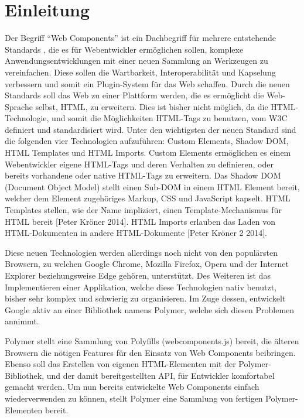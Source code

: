 \chapter{Einleitung}\label{einleitung}

Der Begriff ``Web Components'' ist ein Dachbegriff für mehrere
entstehende Standards \cite{WebComponentsC24:online}, die es für
Webentwickler ermöglichen sollen, komplexe Anwendungsentwicklungen mit
einer neuen Sammlung an Werkzeugen zu vereinfachen. Diese sollen die
Wartbarkeit, Interoperabilität und Kapselung verbessern und somit ein
Plugin-System für das Web schaffen. Durch die neuen Standards soll das
Web zu einer Plattform werden, die es ermöglicht die Web-Sprache selbst,
\ac{HTML}, zu erweitern. Dies ist bisher nicht möglich, da die
HTML-Technologie, und somit die Möglichkeiten HTML-Tags zu benutzen, vom
\ac{W3C} definiert und standardisiert wird. Unter den wichtigsten der
neuen Standard sind die folgenden vier Technologien aufzuführen: Custom
Elements, Shadow DOM, HTML Templates und HTML Imports. Custom Elements
ermöglichen es einem Webentwickler eigene HTML-Tags und deren Verhalten
zu definieren, oder bereits vorhandene oder native HTML-Tags zu
erweitern. Das Shadow DOM (Document Object Model) stellt einen Sub-DOM
in einem HTML Element bereit, welcher dem Element zugehöriges Markup,
CSS und JavaScript kapselt. HTML Templates stellen, wie der Name
impliziert, einen Template-Mechanismus für HTML bereit {[}Peter Kröner
2014{]}. HTML Imports erlauben das Laden von HTML-Dokumenten in andere
HTML-Dokumente {[}Peter Kröner 2 2014{]}.

Diese neuen Technologien werden allerdings noch nicht von den
populärsten Browsern, zu welchen Google Chrome, Mozilla Firefox, Opera
und der Internet Explorer beziehungsweise Edge gehören, unterstützt. Des
Weiteren ist das Implementieren einer Applikation, welche diese
Technologien nativ benutzt, bisher sehr komplex und schwierig zu
organisieren. Im Zuge dessen, entwickelt Google aktiv an einer
Bibliothek namens Polymer, welche sich diesen Problemen annimmt.

Polymer stellt eine Sammlung von Polyfills (webcomponents.js) bereit,
die älteren Browsern die nötigen Features für den Einsatz von Web
Components beibringen. Ebenso soll das Erstellen von eigenen
HTML-Elementen mit der Polymer-Bibliothek, und der damit
bereitgestellten API, für Entwickler komfortabel gemacht werden. Um nun
bereits entwickelte Web Components einfach wiederverwenden zu können,
stellt Polymer eine Sammlung von fertigen Polymer-Elementen bereit.

